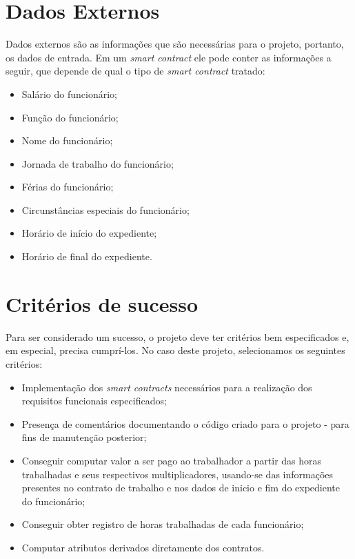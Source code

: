 \documentclass{article}
\begin{document}
\section{Dados Externos}
Dados externos são as informações que são necessárias para o projeto, portanto,
os dados de entrada. Em um \textit{smart contract} ele pode conter as
informações a seguir, que depende de qual o tipo de \textit{smart contract}
tratado:
\begin{itemize}
    \item Salário do funcionário;
    \item Função do funcionário;
    \item Nome do funcionário;
    \item Jornada de trabalho do funcionário;
    \item Férias do funcionário;
    \item Circunstâncias especiais do funcionário;
    \item Horário de início do expediente;
    \item Horário de final do expediente.
\end{itemize}

\section{Critérios de sucesso}
Para ser considerado um sucesso, o projeto deve ter critérios bem especificados
e, em especial, precisa cumprí-los. No caso deste projeto, selecionamos os
seguintes critérios:

\begin{itemize}
    \item Implementação dos \textit{smart contracts} necessários para a
        realização dos requisitos funcionais especificados;
    \item Presença de comentários documentando o código criado para o projeto -
        para fins de manutenção posterior;
    \item Conseguir computar valor a ser pago ao trabalhador a partir das horas
        trabalhadas e seus respectivos multiplicadores, usando-se das
        informações presentes no contrato de trabalho e nos dados de inicio e
        fim do expediente do funcionário;
    \item Conseguir obter registro de horas trabalhadas de cada funcionário;
    \item Computar atributos derivados diretamente dos contratos.
\end{itemize}
\end{document}
